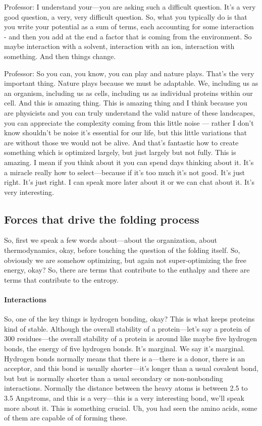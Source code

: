 Professor: I understand your—you are asking such a difficult question. It’s a very good question, a very, very difficult question. So, what you typically do is that you write your potential as a sum of terms, each accounting for some interaction - and then you add at the end a factor that is coming from the environment. So maybe interaction with a solvent, interaction with an ion, interaction with something. And then things change.


Professor: So you can, you know, you can play and nature plays. That's the very important thing. Nature plays because we must be adaptable. We, including us as an organism, including us as cells, including us as individual proteins within our cell. And this is amazing thing. This is amazing thing and I think because you are physicists and you can truly understand the valid nature of these landscapes, you can appreciate the complexity coming from this little noise — rather I don’t know shouldn’t be noise it’s essential for our life, but this little variations that are without those we would not be alive. And that’s fantastic how to create something which is optimized largely, but just largely but not fully. This is amazing. I mean if you think about it you can spend days thinking about it. It’s a miracle really how to select—because if it’s too much it’s not good. It’s just right. It’s just right. I can speak more later about it or we can chat about it. It’s very interesting.


\subsection{Forces that drive the folding process}
So, first we speak a few words about—about the organization, about thermodynamics, okay, before touching the question of the folding itself. So, obviously we are somehow optimizing, but again not super-optimizing the free energy, okay? So, there are terms that contribute to the enthalpy and there are terms that contribute to the entropy. 


\paragraph{Interactions}
So, one of the key things is hydrogen bonding, okay? This is what keeps proteins kind of stable. Although the overall stability of a protein—let’s say a protein of 300 residues—the overall stability of a protein is around like maybe five hydrogen bonds, the energy of five hydrogen bonds. It's marginal. We say it's marginal.
Hydrogen bonds normally means that there is a—there is a donor, there is an acceptor, and this bond is usually shorter—it’s longer than a usual covalent bond, but but is normally shorter than a usual secondary or non-nonbonding interactions. Normally the distance between the heavy atoms is between 2.5 to 3.5 Angstroms, and this is a very—this is a very interesting bond, we’ll speak more about it. This is something crucial. Uh, you had seen the amino acids, some of them are capable of of forming these.

